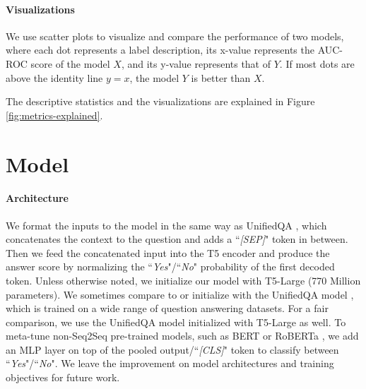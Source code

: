 \paragraph{Visualizations} We use scatter plots to visualize and compare the performance of two models, where each dot represents a label description, its x-value represents the AUC-ROC score of the model $X$, and its y-value represents that of $Y$. If most dots are above the identity line $y=x$, the model $Y$ is better than $X$. 

The descriptive statistics and the visualizations are explained in Figure \ref{fig:metrics-explained}.

\section{Model} \label{sec:training}

\paragraph{Architecture} 
We format the inputs to the model in the same way as UnifiedQA \cite{khashabi-etal-2020-unifiedqa}, which concatenates the context to the question and adds a ``\textit{[SEP]}" token in between. Then we feed the concatenated input into the T5 encoder and produce the answer score by normalizing the ``\textit{Yes}"/``\textit{No}" probability of the first decoded token. Unless otherwise noted, we initialize our model with T5-Large (770 Million parameters). We sometimes compare to or initialize with the UnifiedQA model \cite{khashabi-etal-2020-unifiedqa}, which is trained on a wide range of question answering datasets. For a fair comparison, we use the UnifiedQA model initialized with T5-Large as well. To meta-tune non-Seq2Seq pre-trained models, such as BERT \cite{devlin-etal-2019-bert} or RoBERTa \cite{liu-etal-2019-robust}, we add an MLP layer on top of the pooled output/``\textit{[CLS]}" token to classify between ``\textit{Yes}"/``\textit{No}". 
We leave the improvement on model architectures \cite{ye2021zero, li2021prefix, lester2021power} and training objectives \cite{murtydreca, Yin2020Meta-Learning} for future work. 

